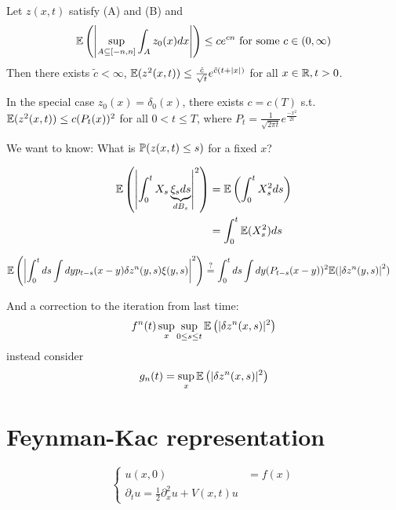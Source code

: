 \begin{lemma}\label{lem:5.9}
    Let $z(x,t)$ satisfy (A) and (B) and 
    \[\mathbb{E}\left(\left\vert\sup_{A\subseteq [-n,n]}\int_A z_0(x)dx\right\vert\right)\leq ce^{cn}\text{ for some }c\in(0,\infty)\]
    Then there exists $\tilde{c}<\infty$, $\mathbb{E}(z^2(x,t))\leq \frac{\tilde{c}}{\sqrt{t}}e^{\tilde{c}(t+|x|)}$ for all $x\in\mathbb{R},t>0$.

\end{lemma}

   In the special case $z_0(x)=\delta_0(x)$, there exists $c=c(T)$ s.t.$\mathbb{E}(z^2(x,t))\leq c(P_t(x))^2$ for all $0<t\leq T$, where $P_t=\frac{1}{\sqrt{2\pi t}}e^{\frac{-x^2}{2t}}$

We want to know: What is $\mathbb{P}(z(x,t)\leq s)$ for a fixed $x$?


\begin{align*}
    \mathbb{E}\left(\left\vert \int_0^t X_s\underbrace{\xi_sds}_{dB_s}\right\vert^2\right)&=\mathbb{E}\left(\int_0^t X_s^2ds\right)\\
    &=\int_0^t\mathbb{E}(X_s^2)ds
\end{align*}


\begin{align*}
    \mathbb{E}\left(\left\vert \int_0^t ds \int dy p_{t-s}(x-y)\delta z^n(y,s)\xi(y,s)\right\vert^2\right)&\stackrel{?}{=}\int_0^t ds \int dy (P_{t-s}(x-y))^2\mathbb{E}(\left\vert \delta z^n(y,s)\right\vert^2)
\end{align*}

And a correction to the iteration from last time:
\[f^n(t)\sup_{x}\sup_{0\leq s\leq t}\mathbb{E}\left(\vert \delta z^n(x,s)\vert^2\right)\]
instead consider 
\[g_n(t)=\sup_{x}\mathbb{E}\left(\vert \delta z^n(x,s)\vert^2\right)\]




\section{Feynman-Kac representation}

\begin{equation}
    \begin{cases}
        u(x,0) &= f(x)\\
        \partial_t u=\frac{1}{2}\partial_x^2 u + V(x,t)u
    \end{cases}
\end{equation}


